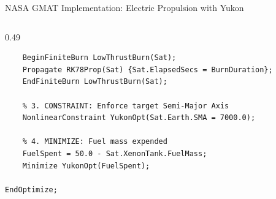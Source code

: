 \documentclass[aspectratio=169, 10pt]{beamer}
\begin{document}
\begin{frame}[fragile]{NASA GMAT Implementation: Electric Propulsion with Yukon}
\begin{columns}[T]
\begin{column}{0.49\textwidth}
\begin{lstlisting}[style=gmatstyle]
    % 2. EXECUTE: 7D Numerical Finite Burn Arc
    BeginFiniteBurn LowThrustBurn(Sat);
    Propagate RK78Prop(Sat) {Sat.ElapsedSecs = BurnDuration};
    EndFiniteBurn LowThrustBurn(Sat);

    % 3. CONSTRAINT: Enforce target Semi-Major Axis
    NonlinearConstraint YukonOpt(Sat.Earth.SMA = 7000.0);

    % 4. MINIMIZE: Fuel mass expended
    FuelSpent = 50.0 - Sat.XenonTank.FuelMass;
    Minimize YukonOpt(FuelSpent);

EndOptimize;
\end{lstlisting}
        \end{column}
    \end{columns}
\end{frame}

\end{document}
